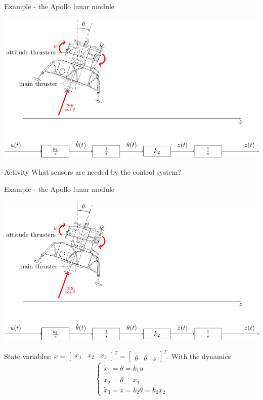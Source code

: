 \documentclass[presentation,aspectratio=1610]{beamer}
\begin{document}
\begin{frame}[label={sec:orgedc44d8}]{Example - the Apollo lunar module}
\begin{center}
\includegraphics[width=0.8\linewidth]{fig-apollo}
\end{center}
\alert{Activity} What sensors are needed by the control system?
\end{frame}

\begin{frame}[label={sec:org09e1bba}]{Example - the Apollo lunar module}
\begin{center}
\includegraphics[width=0.7\linewidth]{fig-apollo}
\end{center}

State variables: \(x = \begin{bmatrix} x_1 & x_2 & x_3 \end{bmatrix}^T = \begin{bmatrix} \dot{\theta} & \theta & \dot{z} \end{bmatrix}^T\). With the dynamics
\[ \begin{cases} \dot{x}_1 =  \ddot{\theta} = k_1 u\\ \dot{x}_2 = \dot{\theta} = x_1\\ \dot{x}_3 = \ddot{z} = k_2\theta = k_2x_2 \end{cases} \]
\end{frame}
\end{document}
